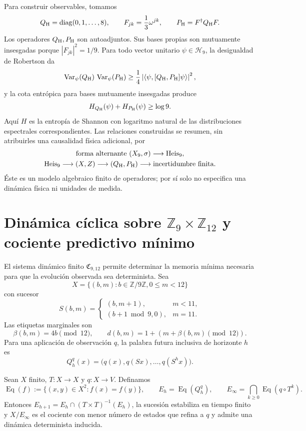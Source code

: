 Para construir observables, tomamos
\[
Q_{\rm H}=\operatorname{diag}(0,1,\ldots,8),
\qquad
F_{jk}=\frac13\omega^{jk},
\qquad
P_{\rm H}=F^\dagger Q_{\rm H}F.
\]
Los operadores \(Q_{\rm H},P_{\rm H}\) son autoadjuntos. Sus bases propias son mutuamente
insesgadas porque \(|F_{jk}|^2=1/9\). Para todo vector unitario
\(\psi\in\mathcal H_9\), la desigualdad de Robertson da
\[
\operatorname{Var}_\psi(Q_{\rm H})\,
\operatorname{Var}_\psi(P_{\rm H})
\ge
\frac14\left|\langle\psi,[Q_{\rm H},P_{\rm H}]\psi\rangle\right|^2,
\]
y la cota entrópica para bases mutuamente insesgadas produce
\[
H_{Q_{\rm H}}(\psi)+H_{P_{\rm H}}(\psi)\ge\log9.
\]
Aquí \(H\) es la entropía de Shannon con logaritmo natural de las
distribuciones espectrales correspondientes. Las relaciones construidas se
resumen, sin atribuirles una causalidad física adicional, por
\[
\begin{gathered}
\text{forma alternante }(X_9,\sigma)
\longrightarrow
\operatorname{Heis}_9,\\
\operatorname{Heis}_9\longrightarrow(X,Z)
\longrightarrow(Q_{\rm H},P_{\rm H})
\longrightarrow\text{incertidumbre finita}.
\end{gathered}
\]
Éste es un modelo algebraico finito de operadores; por sí solo no especifica
una dinámica física ni unidades de medida.

\section{Dinámica cíclica sobre \texorpdfstring{\(\mathbb Z_9\times\mathbb Z_{12}\)}{Z9 x Z12} y cociente predictivo mínimo}

El sistema dinámico finito \(\mathfrak C_{9,12}\) permite determinar la memoria
mínima necesaria para que la evolución observada sea determinista. Sea
\[
X=\{(b,m):b\in\mathbb Z/9\mathbb Z, 0\le m<12\}
\]
con sucesor
\[
S(b,m)=
\begin{cases}
(b,m+1),&m<11,\\
(b+1\bmod9,0),&m=11.
\end{cases}
\]
Las etiquetas marginales son
\[
\beta(b,m)=4b\pmod{12},
\qquad
d(b,m)=1+(m+\beta(b,m)\pmod{12}).
\]
Para una aplicación de observación \(q\), la palabra futura inclusiva de horizonte \(h\) es
\[
Q_h^q(x)=\bigl(q(x),q(Sx),\ldots,q(S^hx)\bigr).
\]

\begin{theorem}
Sean \(X\) finito, \(T:X\to X\) y \(q:X\to V\). Definamos
\[
\operatorname{Eq}(f):=\{(x,y)\in X^2:f(x)=f(y)\},
\qquad
E_h=\operatorname{Eq}(Q_h^q),
\qquad
E_\infty=\bigcap_{k\ge0}\operatorname{Eq}(q\circ T^k).
\]
Entonces
\(E_{h+1}=E_h\cap(T\times T)^{-1}(E_h)\), la sucesión estabiliza en tiempo
finito y \(X/E_\infty\) es el cociente con menor número de estados que
refina a \(q\) y admite una dinámica determinista inducida.
\end{theorem}

